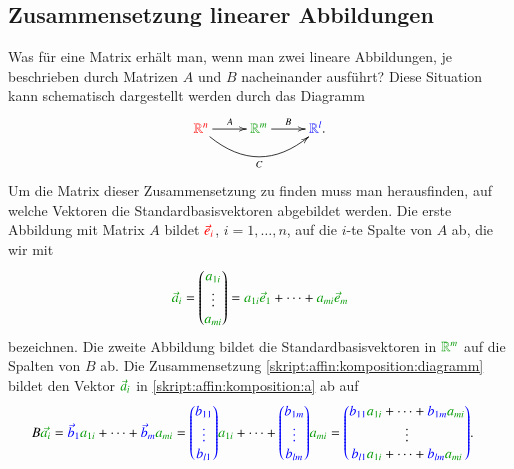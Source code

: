\subsection{Zusammensetzung linearer Abbildungen}
Was für eine Matrix erhält man, wenn man zwei lineare Abbildungen,
je beschrieben durch Matrizen $A$ und $B$ nacheinander ausführt?
Diese Situation kann schematisch dargestellt werden durch das Diagramm
\begin{equation}
\definecolor{darkgreen}{rgb}{0,0.6,0}
\xymatrix{
{\color{red}\mathbb R^n } \ar[r]^{A} \ar@/_20pt/[rr]_{C}
&{\color{darkgreen}\mathbb R^m} \ar[r]^{B}
&{{\color{blue}\mathbb R^l}.}
}
\label{skript:affin:komposition:diagramm}
\end{equation}
Um die Matrix dieser Zusammensetzung zu finden muss man herausfinden,
auf welche Vektoren die Standardbasisvektoren abgebildet werden.
Die erste Abbildung mit Matrix $A$ bildet $\color{red}\vec{e}_i$,
$i=1,\dots,n$, auf die $i$-te Spalte von $A$ ab, die wir mit
\begin{equation}
\definecolor{darkgreen}{rgb}{0,0.6,0}
{\color{darkgreen}\vec{a}_i}
=\begin{pmatrix}
{\color{darkgreen}a_{1i}}\\\vdots\\{\color{darkgreen}a_{mi}}
\end{pmatrix}
=
{ \color{darkgreen} a_{1i} \vec{e}_1}
+\dots +
{ \color{darkgreen} a_{mi} \vec{e}_m}
\label{skript:affin:komposition:a}
\end{equation}
bezeichnen.
Die zweite Abbildung bildet die Standardbasisvektoren in
$\definecolor{darkgreen}{rgb}{0,0.6,0}
\color{darkgreen}\mathbb R^m$ auf die Spalten
von $B$ ab.
Die Zusammensetzung \eqref{skript:affin:komposition:diagramm}
bildet den Vektor 
$\definecolor{darkgreen}{rgb}{0,0.6,0}
\color{darkgreen}
\vec{a}_i$ in \eqref{skript:affin:komposition:a} 
ab auf 
{%
%
\begin{align*}
B{\color{darkgreen}\vec{a_i}}
&=
{\color{blue}\vec{b}_1} {\color{darkgreen}a_{1i}}+\dots
+{\color{blue}\vec{b}_m}{\color{darkgreen}a_{mi}}
=
{\color{blue}
\begin{pmatrix}b_{11}\\\vdots\\b_{l1}\end{pmatrix}} {\color{darkgreen}a_{1i}}
+\dots+
{\color{blue}
\begin{pmatrix}b_{1m}\\\vdots\\b_{lm}\end{pmatrix}} {\color{darkgreen}a_{mi}}
=
{\color{blue}
\begin{pmatrix}
\color{black}
{\color{blue}b_{11}}{\color{darkgreen}a_{1i}}+\dots+{\color{blue}b_{1m}}{\color{darkgreen}a_{mi}}\\
\color{black} \vdots\\
\color{black}
{\color{blue}b_{l1}}{\color{darkgreen}a_{1i}}+\dots+{\color{blue}b_{lm}}{\color{darkgreen}a_{mi}}\\
\end{pmatrix}
}.
\end{align*}}%
